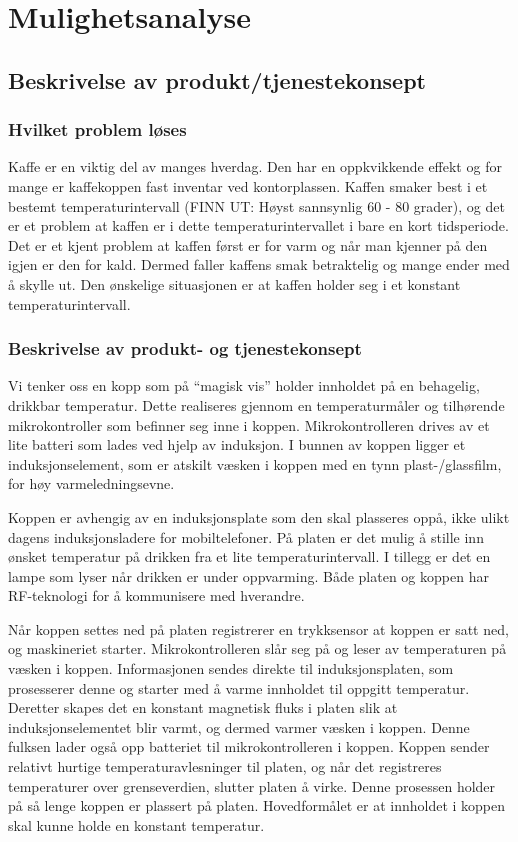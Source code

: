 \chapter{Mulighetsanalyse}
\section{Beskrivelse av produkt/tjenestekonsept}
\subsection{Hvilket problem løses}
Kaffe er en viktig del av manges hverdag. Den har en oppkvikkende effekt og for mange er kaffekoppen fast inventar ved kontorplassen. Kaffen smaker best i et bestemt temperaturintervall (FINN UT: Høyst sannsynlig 60 - 80 grader), og det er et problem at kaffen er i dette temperaturintervallet i bare en kort tidsperiode. Det er et kjent problem at kaffen først er for varm og når man kjenner på den igjen er den for kald. Dermed faller kaffens smak betraktelig og mange ender med å skylle ut. Den ønskelige situasjonen er at kaffen holder seg i et konstant temperaturintervall. 

\subsection{Beskrivelse av produkt- og tjenestekonsept}
Vi tenker oss en kopp som på “magisk vis” holder innholdet på en behagelig, drikkbar temperatur. Dette realiseres gjennom en temperaturmåler og tilhørende mikrokontroller som befinner seg inne i koppen. Mikrokontrolleren drives av et lite batteri som lades ved hjelp av induksjon. I bunnen av koppen ligger et induksjonselement, som er atskilt væsken i koppen med en tynn plast-/glassfilm, for høy varmeledningsevne.

Koppen er avhengig av en induksjonsplate som den skal plasseres oppå, ikke ulikt dagens induksjonsladere for mobiltelefoner. På platen er det mulig å stille inn ønsket temperatur på drikken fra et lite temperaturintervall. I tillegg er det en lampe som lyser når drikken er under oppvarming. Både platen og koppen har RF-teknologi for å kommunisere med hverandre.

Når koppen settes ned på platen registrerer en trykksensor at koppen er satt ned, og maskineriet starter. Mikrokontrolleren slår seg på og leser av temperaturen på væsken i koppen. Informasjonen sendes direkte til induksjonsplaten, som prosesserer denne og starter med å varme innholdet til oppgitt temperatur. Deretter skapes det en konstant magnetisk fluks i platen slik at induksjonselementet blir varmt, og dermed varmer væsken i koppen. Denne fulksen lader også opp batteriet til mikrokontrolleren i koppen. 
Koppen sender relativt hurtige temperaturavlesninger til platen, og når det registreres temperaturer over grenseverdien, slutter platen å virke. Denne prosessen holder på så lenge koppen er plassert på platen. Hovedformålet er at innholdet i koppen skal kunne holde en konstant temperatur.

